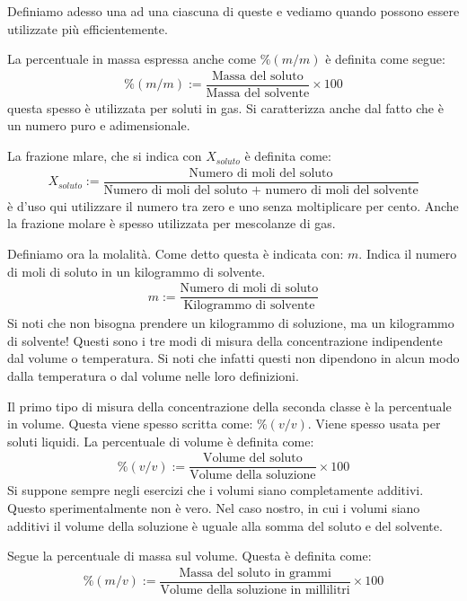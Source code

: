\documentclass[../AppuntiChimica]{subfiles}
\begin{document}
	Definiamo adesso una ad una ciascuna di queste e vediamo quando possono essere utilizzate più efficientemente.
	
	La percentuale in massa espressa anche come $ \%(m/m) $ è definita come segue:
	\begin{gather*}
		\%(m/m):=\dfrac{\text{Massa del soluto}}{\text{Massa del solvente}}\times 100
	\end{gather*}
	questa spesso è utilizzata per soluti in gas. Si caratterizza anche dal fatto che è un numero puro e adimensionale.
	
	La frazione mlare, che si indica con $ X_{soluto} $ è definita come:
	\begin{gather*}
		X_{soluto}:=\dfrac{\text{Numero di moli del soluto}}{\text{Numero di moli del soluto + numero di moli del solvente}}
	\end{gather*}
	è d'uso qui utilizzare il numero tra zero e uno senza moltiplicare per cento. Anche la frazione molare è spesso utilizzata per mescolanze di gas.
	
	Definiamo ora la molalità. Come detto questa è indicata con: $ m $. Indica il numero di moli di soluto in un kilogrammo di solvente.
	\begin{gather*}
		m:=\dfrac{\text{Numero di moli di soluto}}{\text{Kilogrammo di solvente}}
	\end{gather*}
	Si noti che non bisogna prendere un kilogrammo di soluzione, ma un kilogrammo di solvente! Questi sono i tre modi di misura della concentrazione indipendente dal volume o temperatura. Si noti che infatti questi non dipendono in alcun modo dalla temperatura o dal volume nelle loro definizioni.
	
	Il primo tipo di misura della concentrazione della seconda classe è la percentuale in volume. Questa viene spesso scritta come: $ \%(v/v) $. Viene spesso usata per soluti liquidi. La percentuale di volume è definita come:
	\begin{gather*}
		\%(v/v):=\dfrac{\text{Volume del soluto}}{\text{Volume della soluzione}}\times 100
	\end{gather*}
	Si suppone sempre negli esercizi che i volumi siano completamente additivi. Questo sperimentalmente non è vero. Nel caso nostro, in cui i volumi siano additivi il volume della soluzione è uguale alla somma del soluto e del solvente.
	
	Segue la percentuale di massa sul volume. Questa è definita come:
	\begin{gather*}
	\%(m/v):=\dfrac{\text{Massa del soluto in grammi}}{\text{Volume della soluzione in millilitri}}\times 100
	\end{gather*}
	
\end{document}
